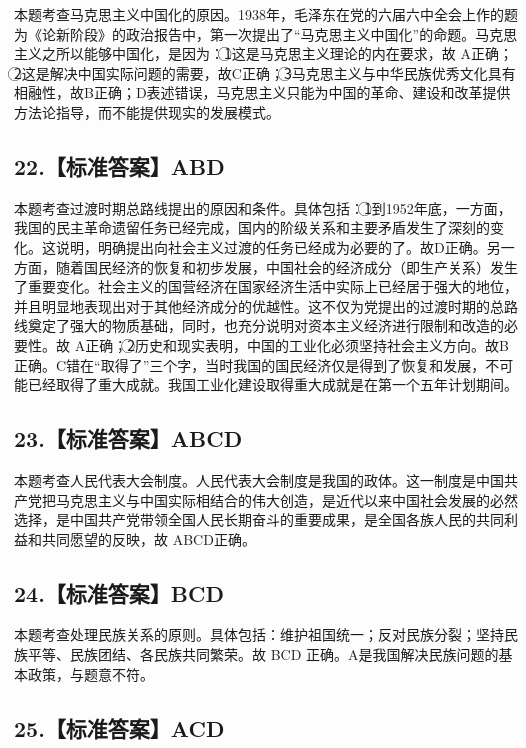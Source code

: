 \documentclass[UTF8,11pt]{ctexart}
\begin{document}
本题考查马克思主义中国化的原因。1938年，毛泽东在党的六届六中全会上作的题为《论新阶段》的政治报告中，第一次提出了“马克思主义中国化”的命题。马克思主义之所以能够中国化，是因为：\textcircled{1}这是马克思主义理论的内在要求，故 A正确；\textcircled{2}这是解决中国实际问题的需要，故C正确；\textcircled{3}马克思主义与中华民族优秀文化具有相融性，故B正确；D表述错误，马克思主义只能为中国的革命、建设和改革提供方法论指导，而不能提供现实的发展模式。


\subsection*{22.【标准答案】ABD}

本题考查过渡时期总路线提出的原因和条件。具体包括：\textcircled{1}到1952年底，一方面，我国的民主革命遗留任务已经完成，国内的阶级关系和主要矛盾发生了深刻的变化。这说明，明确提出向社会主义过渡的任务已经成为必要的了。故D正确。另一方面，随着国民经济的恢复和初步发展，中国社会的经济成分（即生产关系）发生了重要变化。社会主义的国营经济在国家经济生活中实际上已经居于强大的地位，并且明显地表现出对于其他经济成分的优越性。这不仅为党提出的过渡时期的总路线奠定了强大的物质基础，同时，也充分说明对资本主义经济进行限制和改造的必要性。故 A正确；\textcircled{2}历史和现实表明，中国的工业化必须坚持社会主义方向。故B正确。C错在“取得了”三个字，当时我国的国民经济仅是得到了恢复和发展，不可能已经取得了重大成就。我国工业化建设取得重大成就是在第一个五年计划期间。


\subsection*{23.【标准答案】ABCD}

本题考查人民代表大会制度。人民代表大会制度是我国的政体。这一制度是中国共产党把马克思主义与中国实际相结合的伟大创造，是近代以来中国社会发展的必然选择，是中国共产党带领全国人民长期奋斗的重要成果，是全国各族人民的共同利益和共同愿望的反映，故 ABCD正确。


\subsection*{24.【标准答案】BCD}

本题考查处理民族关系的原则。具体包括：维护祖国统一；反对民族分裂；坚持民族平等、民族团结、各民族共同繁荣。故 BCD 正确。A是我国解决民族问题的基本政策，与题意不符。


\subsection*{25.【标准答案】ACD}
\end{document}
